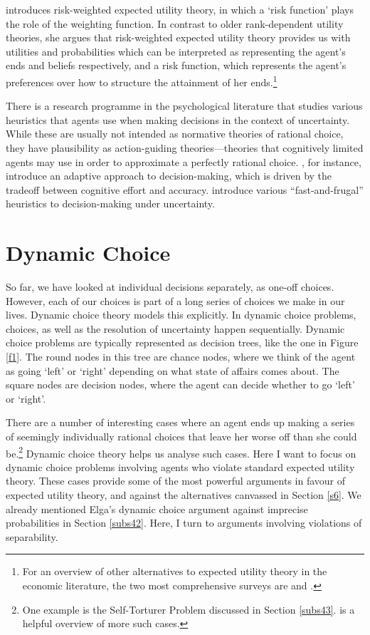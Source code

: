 \citet{Buchak2013} introduces risk-weighted expected utility theory, in which a `risk function' plays the role of the weighting function. In contrast to older rank-dependent utility theories, she argues that risk-weighted expected utility theory provides us with utilities and probabilities which can be interpreted as representing the agent's ends and beliefs respectively, and a risk function, which represents the agent's preferences over how to structure the attainment of her ends.\footnote{For an overview of other alternatives to expected utility theory in the economic literature, the two most comprehensive surveys are \citet{Schmidt2004} and \citet{Sugden2004}.}

There is a research programme in the psychological literature that studies various heuristics that agents use when making decisions in the context of uncertainty. While these are usually not intended as normative theories of rational choice, they have plausibility as action-guiding theories---theories that cognitively limited agents may use in order to approximate a perfectly rational choice. \citet{Payneetal1993}, for instance, introduce an adaptive approach to decision-making, which is driven by the tradeoff between cognitive effort and accuracy.
\citet{GigerenzerTodd2000} introduce various ``fast-and-frugal'' heuristics to decision-making under uncertainty.

\section{Dynamic Choice}\label{s7}

So far, we have looked at individual decisions separately, as one-off choices. However, each of our choices is part of a long series of choices we make in our lives. Dynamic choice theory models this explicitly. In dynamic choice problems, choices, as well as the resolution of uncertainty happen sequentially. Dynamic choice problems are typically represented as decision trees, like the one in Figure \ref{f1}. The round nodes in this tree are chance nodes, where we think of the agent as going `left' or `right' depending on what state of affairs comes about. The square nodes are decision nodes, where the agent can decide whether to go `left' or `right'.

There are a number of interesting cases where an agent ends up making a series of seemingly individually rational choices that leave her worse off than she could be.\footnote{One example is the Self-Torturer Problem discussed in Section \ref{subs43}. \citet{Andreou2012} is a helpful overview of more such cases.} Dynamic choice theory helps us analyse such cases. Here I want to focus on dynamic choice problems involving agents who violate standard expected utility theory. These cases provide some of the most powerful arguments in favour of expected utility theory, and against the alternatives canvassed in Section \ref{s6}. We already mentioned Elga's dynamic choice argument against imprecise probabilities in Section \ref{subs42}. Here, I turn to arguments involving violations of separability.

